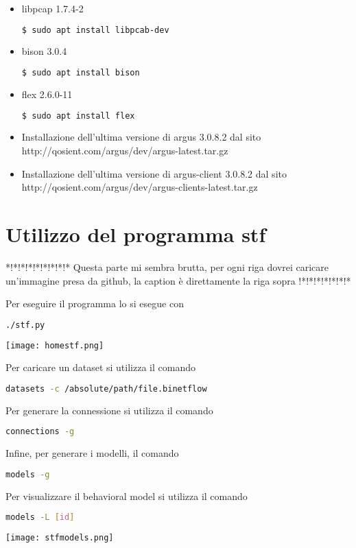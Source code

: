 \documentclass[../main.tex]{subfiles}
\begin{document}
\begin{itemize}
				\item libpcap 1.7.4-2
\begin{lstlisting}[language=bash]
$ sudo apt install libpcab-dev
\end{lstlisting}

\item bison 3.0.4
\begin{lstlisting}[language=bash]
$ sudo apt install bison
\end{lstlisting}

\item flex 2.6.0-11
\begin{lstlisting}[language=bash]
$ sudo apt install flex
\end{lstlisting}

\item Installazione dell'ultima versione di argus 3.0.8.2 dal sito http://qosient.com/argus/dev/argus-latest.tar.gz

\item Installazione dell'ultima versione di argus-client 3.0.8.2 dal sito http://qosient.com/argus/dev/argus-clients-latest.tar.gz

\end{itemize}
\section{Utilizzo del programma stf\\}
*!*!*!*!*!*!*!*!* Questa parte mi sembra brutta, per ogni riga dovrei caricare un'immagine presa da github, la caption è direttamente la riga sopra !*!*!*!*!*!*!*\newline

Per eseguire il programma lo si esegue con
\begin{lstlisting}[language=bash]
	./stf.py
\end{lstlisting}
\texttt{[image: homestf.png]}

Per caricare un dataset si utilizza il comando
\begin{lstlisting}[language=bash]
	datasets -c /absolute/path/file.binetflow	
\end{lstlisting}

Per generare la connessione si utilizza il comando
\begin{lstlisting}[language=bash]
	connections -g	
\end{lstlisting}

Infine, per generare i modelli, il comando
\begin{lstlisting}[language=bash]
	models -g	
\end{lstlisting}

Per visualizzare il behavioral model si utilizza il comando
\begin{lstlisting}[language=bash]
	models -L [id]	
\end{lstlisting}
\texttt{[image: stfmodels.png]}
\end{document}
